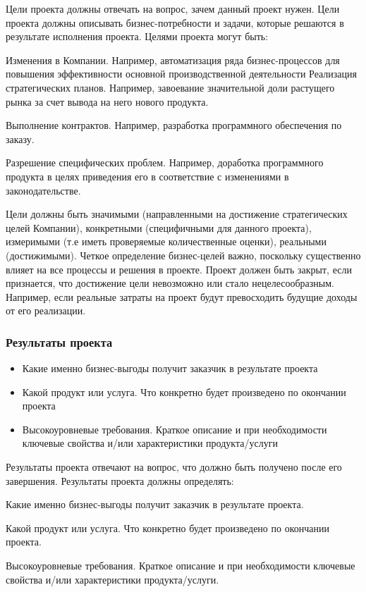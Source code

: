 \documentclass{../industrial-development}
\begin{document}
Цели проекта должны отвечать на вопрос, зачем данный проект нужен. Цели проекта должны описывать бизнес-потребности и задачи, которые решаются в результате исполнения проекта. Целями проекта могут быть:

Изменения в Компании. Например, автоматизация ряда бизнес-процессов для повышения эффективности основной производственной деятельности
Реализация стратегических планов. Например, завоевание значительной доли растущего рынка за счет вывода на него нового продукта.

Выполнение контрактов. Например, разработка программного обеспечения по заказу.

Разрешение специфических проблем. Например, доработка программного продукта в целях приведения его в соответствие с изменениями в законодательстве.

Цели должны быть значимыми (направленными на достижение стратегических целей Компании), конкретными (специфичными для данного проекта), измеримыми (т.е иметь проверяемые количественные оценки), реальными (достижимыми). Четкое определение бизнес-целей важно, поскольку существенно влияет на все процессы и решения в проекте. Проект должен быть закрыт, если признается, что достижение цели невозможно или стало нецелесообразным. Например, если реальные затраты на проект будут превосходить будущие доходы от его реализации.

    \begin{frame} \frametitle{Результаты проекта}
	\begin{itemize}
		\item Какие именно бизнес-выгоды получит заказчик в результате проекта
		\item Какой продукт или услуга. Что конкретно будет произведено по окончании проекта
		\item Высокоуровневые требования. Краткое описание и при необходимости ключевые свойства и/или характеристики продукта/услуги
	\end{itemize}
    \end{frame}
    \lecturenotes

Результаты проекта отвечают на вопрос, что должно быть получено после его завершения. Результаты проекта должны определять:

Какие именно бизнес-выгоды получит заказчик в результате проекта.

Какой продукт или услуга. Что конкретно будет произведено по окончании проекта.

Высокоуровневые требования. Краткое описание и при необходимости ключевые свойства и/или характеристики продукта/услуги.
\end{document}
